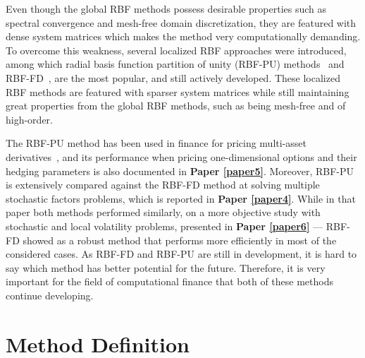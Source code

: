 \documentclass{UUThesisTemplate}
\begin{document}
\par
Even though the global RBF methods possess desirable properties such as spectral convergence and mesh-free domain discretization, they are featured with dense system matrices which makes the method very computationally demanding. To overcome this weakness, several localized RBF approaches were introduced, among which radial basis function partition of unity (RBF-PU) methods~\cite{wendland2002fast} and RBF-FD~\cite{tolstykh2000using, wright2006scattered}, are the most popular, and still actively developed. These localized RBF methods are featured with sparser system matrices while still maintaining great properties from the global RBF methods, such as being mesh-free and of high-order.

\par
The RBF-PU method has been used in finance for pricing multi-asset derivatives~\cite{safdari2015radial, shcherbakov2016radialvanilla, shcherbakov2016radial}, and its performance when pricing one-dimensional options and their hedging parameters is also documented in \textbf{Paper \ref{paper5}}. Moreover, RBF-PU is extensively compared against the RBF-FD method at solving multiple stochastic factors problems, which is reported in \textbf{Paper \ref{paper4}}. While in that paper both methods performed similarly, on a more objective study with stochastic and local volatility problems, presented in \textbf{Paper \ref{paper6}} --- RBF-FD showed as a robust method that performs more efficiently in most of the considered cases. As RBF-FD and RBF-PU are still in development, it is hard to say which method has better potential for the future. Therefore, it is very important for the field of computational finance that both of these methods continue developing.
%





%
\section{Method Definition}
\end{document}
